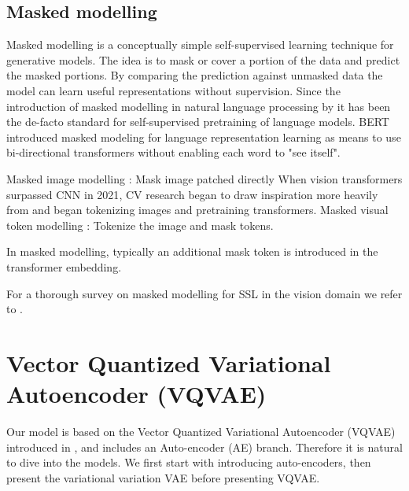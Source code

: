\documentclass[../../thesis.tex]{subfiles}
\begin{document}

\subsection{Masked modelling}
\label{section:Masked modelling}
Masked modelling is a conceptually simple self-supervised learning technique for generative models. The idea is to mask or cover a portion of the data and predict the masked portions. By comparing the prediction against unmasked data the model can learn useful representations without supervision. Since the introduction of masked modelling in natural language processing by \cite{devlin2019bert} it has been the de-facto standard for self-supervised pretraining of language models. BERT introduced masked modeling for language representation learning as means to use bi-directional transformers without enabling each word to "see itself". \newline
{}


Masked image modelling \cite{he2021masked}: Mask image patched directly \newline
When vision transformers \cite{dosovitskiy2021image} surpassed CNN in 2021\cite{he2015deep}, CV research began to draw inspiration more heavily from \cite{devlin2019bert} and began tokenizing images and pretraining transformers.\newline
Masked visual token modelling \cite{chang2022maskgit}: Tokenize the image and mask tokens. \newline

In masked modelling, typically an additional mask token is introduced in the transformer embedding. 



For a thorough survey on masked modelling for SSL in the vision domain we refer to \cite{li2024masked}. 





\section{Vector Quantized Variational Autoencoder (VQVAE)}
\label{section:VQVAE}
Our model is based on the Vector Quantized Variational Autoencoder (VQVAE) introduced in \cite{VQVAE}, and includes an Auto-encoder (AE) branch. Therefore it is natural to dive into the models. We first start with introducing auto-encoders, then present the variational variation VAE before presenting VQVAE. 
\end{document}
